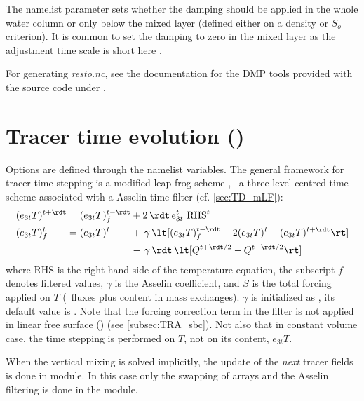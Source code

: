\documentclass[../main/NEMO_manual]{subfiles}
\begin{document}
The namelist parameter  sets whether the damping should be applied in
the whole water column or only below the mixed layer (defined either on a density or $S_o$ criterion).
It is common to set the damping to zero in the mixed layer as the adjustment time scale is short here
\citep{madec.delecluse.ea_JPO96}.

For generating \textit{resto.nc},
see the documentation for the DMP tools provided with the source code under .

\section[Tracer time evolution (\textit{tranxt.F90})]{Tracer time evolution (\protect{})}
\label{sec:TRA_nxt}

Options are defined through the  namelist variables.
The general framework for tracer time stepping is a modified leap-frog scheme
\citep{leclair.madec_OM09}, \ie\ a three level centred time scheme associated with
a Asselin time filter (cf. \autoref{sec:TD_mLF}):
\begin{equation}
  \label{eq:TRA_nxt}
  \begin{alignedat}{5}
    &(e_{3t}T)^{t + \rdt} &&= (e_{3t}T)_f^{t - \rdt} &&+ 2 \, \rdt \,e_{3t}^t \ \text{RHS}^t \\
    &(e_{3t}T)_f^t        &&= (e_{3t}T)^t            &&+ \, \gamma \, \lt[ (e_{3t}T)_f^{t - \rdt} - 2(e_{3t}T)^t + (e_{3t}T)^{t + \rdt} \rt] \\
    &                     &&                         &&- \, \gamma \, \rdt \, \lt[ Q^{t + \rdt/2} - Q^{t - \rdt/2} \rt]
  \end{alignedat}
\end{equation}
where RHS is the right hand side of the temperature equation,
the subscript $f$ denotes filtered values, $\gamma$ is the Asselin coefficient,
and $S$ is the total forcing applied on $T$ (\ie\ fluxes plus content in mass exchanges).
$\gamma$ is initialized as , its default value is .
Note that the forcing correction term in the filter is not applied in linear free surface
() (see \autoref{subsec:TRA_sbc}).
Not also that in constant volume case, the time stepping is performed on $T$,
not on its content, $e_{3t}T$.

When the vertical mixing is solved implicitly,
the update of the \textit{next} tracer fields is done in  module.
In this case only the swapping of arrays and the Asselin filtering is done in the  module.
\end{document}
